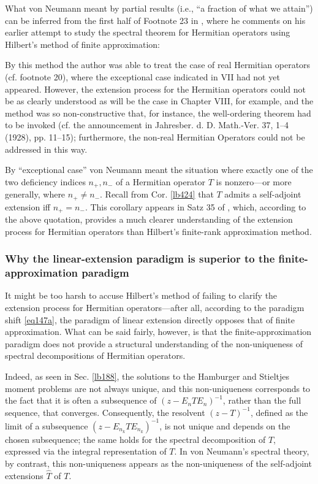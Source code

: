 \documentclass[12pt,b5paper,notitlepage]{article}
\theoremstyle{definition}
\theoremstyle{plain}
\newcommand{\wht}{\widehat}
\numberwithin{equation}{section}
\begin{document}
What von Neumann meant by partial results (i.e., ``a fraction of what we attain'') can be inferred from the first half of Footnote 23 in \cite{vN29a}, where he comments on his earlier attempt to study the spectral theorem for Hermitian operators using Hilbert’s method of finite approximation:


\begin{displayquote}
By this method the author was able to treat the case of real Hermitian operators (cf. footnote 20), where the exceptional case indicated in VII had not yet appeared. However, the extension process for the Hermitian operators could not be as clearly understood as will be the case in Chapter VIII, for example, and the method was so non-constructive that, for instance, the well-ordering theorem had to be invoked (cf. the announcement in Jahresber. d. D. Math.-Ver. 37, 1–4 (1928), pp. 11–15); furthermore, the non-real Hermitian Operators could not be addressed in this way.
\end{displayquote}


By ``exceptional case'' von Neumann meant the situation where exactly one of the two deficiency indices $n_+,n_-$ of a Hermitian operator $T$ is nonzero---or more generally, where $n_+\neq n_-$. Recall from Cor. \ref{lb424} that $T$ admits a self-adjoint extension iff $n_+=n_-$. This corollary appears in Satz 35 of \cite[Chapter VIII]{vN29a}, which, according to the above quotation, provides a much clearer understanding of the extension process for Hermitian operators than Hilbert's finite-rank approximation method.


\subsubsection{Why the linear-extension paradigm is superior to the finite-approximation paradigm}


It might be too harsh to accuse Hilbert’s method of failing to clarify the extension process for Hermitian operators---after all, according to the paradigm shift \eqref{eq147a}, the paradigm of linear extension directly opposes that of finite approximation. What can be said fairly, however, is that the finite-approximation paradigm does not provide a structural understanding of the non-uniqueness of spectral decompositions of Hermitian operators.

Indeed, as seen in Sec. \ref{lb188}, the solutions to the Hamburger and Stieltjes moment problems are not always unique, and this non-uniqueness corresponds to the fact that it is often a subsequence of $(z-E_nTE_n)^{-1}$, rather than the full sequence, that converges. %
Consequently, the resolvent $(z-T)^{-1}$, defined as the limit of a subsequence $(z-E_{n_k}TE_{n_k})^{-1}$, is not unique and depends on the chosen subsequence; the same holds for the spectral decomposition of $T$, expressed via the integral representation of $T$. In von Neumann's spectral theory, by contrast, this non-uniqueness appears as the non-uniqueness of the self-adjoint extensions $\wht T$ of $T$. 
\end{document}
